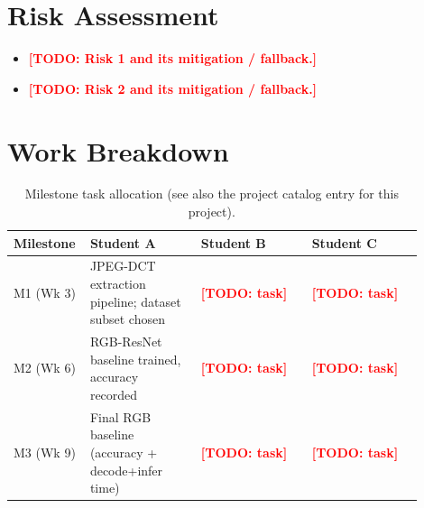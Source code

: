 \documentclass[11pt]{article}
\newcommand{\todo}[1]{\textcolor{red}{\textbf{[TODO: #1]}}}
\begin{document}
\section{Risk Assessment}
\label{sec:risk}
\begin{itemize}[leftmargin=*]
  \item \todo{Risk 1 and its mitigation / fallback.}
  \item \todo{Risk 2 and its mitigation / fallback.}
\end{itemize}

\section{Work Breakdown}
\label{sec:workbreakdown}
\begin{table}[h]
\centering
\caption{Milestone task allocation (see also the project catalog entry for this
project).}
\label{tab:tasks}
\begin{tabular}{@{}p{0.12\linewidth}p{0.26\linewidth}p{0.26\linewidth}p{0.26\linewidth}@{}}
\toprule
\textbf{Milestone} & \textbf{Student A} & \textbf{Student B} & \textbf{Student C} \\
\midrule
M1 (Wk 3) & JPEG-DCT extraction pipeline; dataset subset chosen & \todo{task} & \todo{task} \\
M2 (Wk 6) & RGB-ResNet baseline trained, accuracy recorded & \todo{task} & \todo{task} \\
M3 (Wk 9) & Final RGB baseline (accuracy + decode+infer time) & \todo{task} & \todo{task} \\
\bottomrule
\end{tabular}
\end{table}



\end{document}
